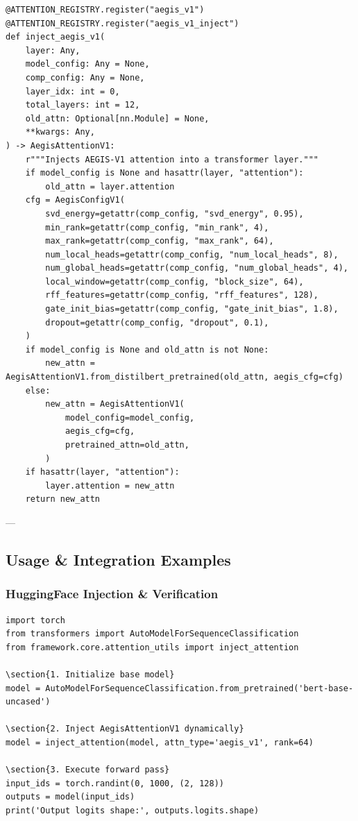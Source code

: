 \begin{lstlisting}
@ATTENTION_REGISTRY.register("aegis_v1")
@ATTENTION_REGISTRY.register("aegis_v1_inject")
def inject_aegis_v1(
    layer: Any,
    model_config: Any = None,
    comp_config: Any = None,
    layer_idx: int = 0,
    total_layers: int = 12,
    old_attn: Optional[nn.Module] = None,
    **kwargs: Any,
) -> AegisAttentionV1:
    r"""Injects AEGIS-V1 attention into a transformer layer."""
    if model_config is None and hasattr(layer, "attention"):
        old_attn = layer.attention
    cfg = AegisConfigV1(
        svd_energy=getattr(comp_config, "svd_energy", 0.95),
        min_rank=getattr(comp_config, "min_rank", 4),
        max_rank=getattr(comp_config, "max_rank", 64),
        num_local_heads=getattr(comp_config, "num_local_heads", 8),
        num_global_heads=getattr(comp_config, "num_global_heads", 4),
        local_window=getattr(comp_config, "block_size", 64),
        rff_features=getattr(comp_config, "rff_features", 128),
        gate_init_bias=getattr(comp_config, "gate_init_bias", 1.8),
        dropout=getattr(comp_config, "dropout", 0.1),
    )
    if model_config is None and old_attn is not None:
        new_attn = AegisAttentionV1.from_distilbert_pretrained(old_attn, aegis_cfg=cfg)
    else:
        new_attn = AegisAttentionV1(
            model_config=model_config,
            aegis_cfg=cfg,
            pretrained_attn=old_attn,
        )
    if hasattr(layer, "attention"):
        layer.attention = new_attn
    return new_attn
\end{lstlisting}


---

\subsection{Usage \& Integration Examples}
\subsubsection{HuggingFace Injection \& Verification}

\begin{lstlisting}
import torch
from transformers import AutoModelForSequenceClassification
from framework.core.attention_utils import inject_attention

\section{1. Initialize base model}
model = AutoModelForSequenceClassification.from_pretrained('bert-base-uncased')

\section{2. Inject AegisAttentionV1 dynamically}
model = inject_attention(model, attn_type='aegis_v1', rank=64)

\section{3. Execute forward pass}
input_ids = torch.randint(0, 1000, (2, 128))
outputs = model(input_ids)
print('Output logits shape:', outputs.logits.shape)
\end{lstlisting}


